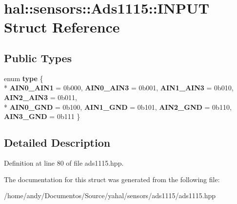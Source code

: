 \hypertarget{structhal_1_1sensors_1_1_ads1115_1_1_i_n_p_u_t}{}\section{hal\+:\+:sensors\+:\+:Ads1115\+:\+:I\+N\+P\+U\+T Struct Reference}
\label{structhal_1_1sensors_1_1_ads1115_1_1_i_n_p_u_t}
\subsection*{Public Types}
\begin{DoxyCompactItemize}
\item 
\hypertarget{structhal_1_1sensors_1_1_ads1115_1_1_i_n_p_u_t_af2ec0c641f654669a38008104687fb9a}{}enum {\bfseries type} \{ \\*
{\bfseries A\+I\+N0\+\_\+\+A\+I\+N1} = 0b000, 
{\bfseries A\+I\+N0\+\_\+\+A\+I\+N3} = 0b001, 
{\bfseries A\+I\+N1\+\_\+\+A\+I\+N3} = 0b010, 
{\bfseries A\+I\+N2\+\_\+\+A\+I\+N3} = 0b011, 
\\*
{\bfseries A\+I\+N0\+\_\+\+G\+N\+D} = 0b100, 
{\bfseries A\+I\+N1\+\_\+\+G\+N\+D} = 0b101, 
{\bfseries A\+I\+N2\+\_\+\+G\+N\+D} = 0b110, 
{\bfseries A\+I\+N3\+\_\+\+G\+N\+D} = 0b111
 \}\label{structhal_1_1sensors_1_1_ads1115_1_1_i_n_p_u_t_af2ec0c641f654669a38008104687fb9a}

\end{DoxyCompactItemize}


\subsection{Detailed Description}


Definition at line 80 of file ads1115.\+hpp.



The documentation for this struct was generated from the following file\+:\begin{DoxyCompactItemize}
\item 
/home/andy/\+Documentos/\+Source/yahal/sensors/ads1115/ads1115.\+hpp\end{DoxyCompactItemize}
